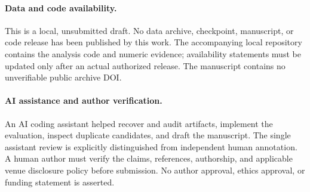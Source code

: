 \documentclass[11pt,a4paper]{article}
\begin{document}
\paragraph{Data and code availability.} This is a local, unsubmitted draft.
No data archive, checkpoint, manuscript, or code release has been published by
this work. The accompanying local repository contains the analysis code and
numeric evidence; availability statements must be updated only after an actual
authorized release. The manuscript contains no unverifiable public archive DOI.

\paragraph{AI assistance and author verification.} An AI coding assistant helped
recover and audit artifacts, implement the evaluation, inspect duplicate
candidates, and draft the manuscript. The single assistant review is explicitly
distinguished from independent human annotation. A human author must verify the
claims, references, authorship, and applicable venue disclosure policy before
submission. No author approval, ethics approval, or funding statement is asserted.
\end{document}
